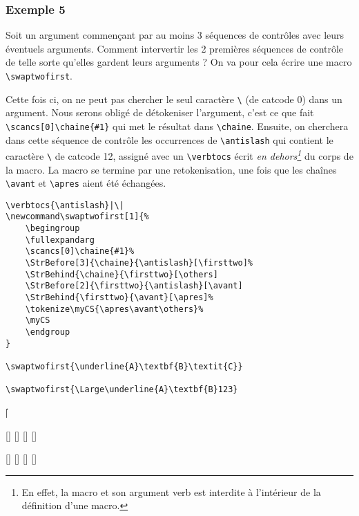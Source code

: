 \documentclass[a4paper,10pt]{article}
\newcommand\styleexercice{\footnotesize}
\newcommand\verbinline{\lstinline[basicstyle=\normalsize\ttfamily]}
\begin{document}
\subsubsection{Exemple 5}
Soit un argument commençant par au moins 3 séquences de contrôles avec leurs éventuels arguments. Comment intervertir les 2 premières séquences de contrôle de telle sorte qu'elles gardent leurs arguments ? On va pour cela écrire une macro \verb|\swaptwofirst|.

Cette fois ci, on ne peut pas chercher le seul caractère \og\verb|\|\fg{} (de catcode 0) dans un argument. Nous serons obligé de détokeniser l'argument, c'est ce que fait \verbinline|\scancs[0]\chaine{#1}| qui met le résultat dans \verb|\chaine|. Ensuite, on cherchera dans cette séquence de contrôle les occurrences de \verb|\antislash| qui contient le caractère \og\verb|\|\fg{} de catcode 12, assigné avec un \verbinline|\verbtocs| écrit \emph{en dehors\footnote{En effet, la macro {\tt\string\verbtocs} et son argument verb est interdite à l'intérieur de la définition d'une macro.}} du corps de la macro. La macro se termine par une retokenisation, une fois que les chaînes \verb|\avant| et \verb|\apres| aient été échangées.\medskip

\begin{minipage}[c]{0.65\linewidth}
\begin{lstlisting}
\verbtocs{\antislash}|\|
\newcommand\swaptwofirst[1]{%
	\begingroup
	\fullexpandarg
	\scancs[0]\chaine{#1}%
	\StrBefore[3]{\chaine}{\antislash}[\firsttwo]%
	\StrBehind{\chaine}{\firsttwo}[\others]
	\StrBefore[2]{\firsttwo}{\antislash}[\avant]
	\StrBehind{\firsttwo}{\avant}[\apres]%
	\tokenize\myCS{\apres\avant\others}%
	\myCS
	\endgroup
}

\swaptwofirst{\underline{A}\textbf{B}\textit{C}}

\swaptwofirst{\Large\underline{A}\textbf{B}123}
\end{lstlisting}%
\end{minipage}\hfill
\begin{minipage}[c]{0.35\linewidth}
	\styleexercice
	\verbtocs{\antislash}|\|
	\newcommand\swaptwofirst[1]{%
		\begingroup
		\fullexpandarg
		\scancs[0]\chaine{#1}%
		\StrBefore[3]{\chaine}{\antislash}[\firsttwo]%
		\StrBehind{\chaine}{\firsttwo}[\others]
		\StrBefore[2]{\firsttwo}{\antislash}[\avant]
		\StrBehind{\firsttwo}{\avant}[\apres]%
		\tokenize\myCS{\apres\avant\others}%
		\myCS
		\endgroup
	}

	\swaptwofirst{\underline{A}\textbf{B}\textit{C}}

	\swaptwofirst{\Large\underline{A}\textbf{B}123}
\end{minipage}%
\end{document}
